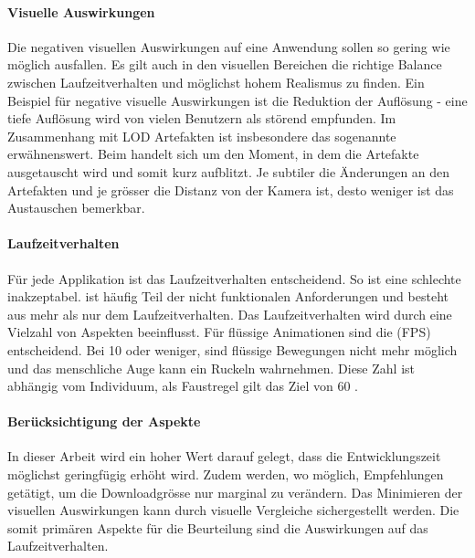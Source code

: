 \paragraph{Visuelle Auswirkungen}

Die negativen visuellen Auswirkungen auf eine Anwendung sollen so gering wie möglich ausfallen. Es gilt auch in den visuellen Bereichen die richtige Balance zwischen Laufzeitverhalten und möglichst hohem Realismus zu finden. Ein Beispiel für negative visuelle Auswirkungen ist die Reduktion der Auflösung - eine tiefe Auflösung wird von vielen Benutzern als störend empfunden. Im Zusammenhang mit LOD Artefakten ist insbesondere das sogenannte  erwähnenswert.
Beim  handelt sich um den Moment, in dem die Artefakte ausgetauscht wird und somit kurz aufblitzt. Je subtiler die Änderungen an den Artefakten und je grösser die Distanz von der Kamera ist, desto weniger ist das Austauschen bemerkbar.

\paragraph{Laufzeitverhalten}

Für jede Applikation ist das Laufzeitverhalten entscheidend. So ist eine schlechte  inakzeptabel.  ist häufig Teil der nicht funktionalen Anforderungen und besteht aus mehr als nur dem Laufzeitverhalten.
Das Laufzeitverhalten wird durch eine Vielzahl von Aspekten beeinflusst.
Für flüssige Animationen sind die  (FPS) entscheidend. Bei 10  oder weniger, sind flüssige Bewegungen nicht mehr möglich und das menschliche Auge kann ein Ruckeln wahrnehmen. Diese Zahl ist abhängig vom Individuum, als Faustregel gilt das Ziel von 60  \cite{limitsOfHumanVision}.

\paragraph{Berücksichtigung der Aspekte}
In dieser Arbeit wird ein hoher Wert darauf gelegt, dass die Entwicklungszeit möglichst geringfügig erhöht wird. Zudem werden, wo möglich, Empfehlungen getätigt, um die Downloadgrösse nur marginal zu verändern. Das Minimieren der visuellen Auswirkungen kann durch visuelle Vergleiche sichergestellt werden.
Die somit primären Aspekte für die Beurteilung sind die Auswirkungen auf das Laufzeitverhalten.

